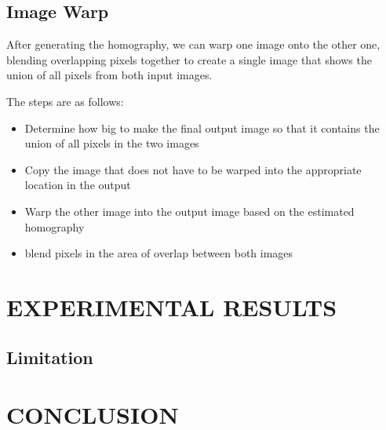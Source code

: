 \documentclass[letterpaper, 10 pt, conference]{ieeeconf}
\begin{document}
\subsection{Image Warp}
After generating the homography, we can warp one image onto the other one, blending overlapping pixels together to create a single image that shows the union of all pixels from both input images. 

The steps are as follows:
\begin{itemize}
    \item Determine how big to make the final output image so that it contains the union of all pixels in the two images
    \item Copy the image that does not have to be warped into the appropriate location in the output
    \item Warp the other image into the output image based on the estimated homography
    \item blend pixels in the area of overlap between both images
\end{itemize}
\section{EXPERIMENTAL RESULTS}
\subsection{}
\subsection{Limitation}


\section{CONCLUSION}
\end{document}
